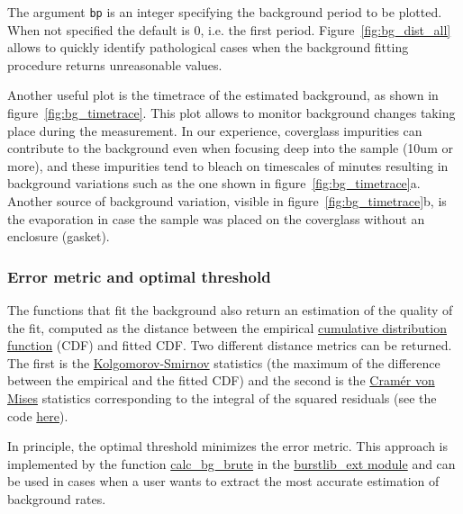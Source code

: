 The argument \verb|bp| is an integer specifying the background period to be plotted.
When not specified the default is 0, i.e. the first period.
Figure~\ref{fig:bg_dist_all} allows to quickly identify pathological cases when the 
background fitting procedure returns unreasonable values. 

Another useful plot is the timetrace of the estimated background, as shown in 
figure~\ref{fig:bg_timetrace}. This plot allows to monitor background changes
taking place during the measurement. In our experience, coverglass impurities
can contribute to the background even when focusing deep into the sample (10um or more),
and these impurities tend to bleach on timescales of minutes resulting in
background variations such as the one shown in figure~\ref{fig:bg_timetrace}a.
Another source of background variation, visible in figure~\ref{fig:bg_timetrace}b, is 
the evaporation in case the sample was placed on the coverglass without an enclosure (gasket).

\subsubsection{Error metric and optimal threshold}

The functions that fit the background also return an estimation of the
quality of the fit, computed as the distance between the empirical
\href{http://en.wikipedia.org/wiki/Cumulative\_distribution\_function}{cumulative distribution function}
(CDF) and fitted CDF. Two different distance metrics can be returned.
The first is the
\href{http://en.wikipedia.org/wiki/Kolmogorov\%E2\%80\%93Smirnov\_test}{Kolgomorov-Smirnov}
statistics (the maximum of the difference between the empirical and the
fitted CDF) and the second is the
\href{http://en.wikipedia.org/wiki/Cram\%C3\%A9r\%E2\%80\%93von\_Mises\_criterion}{Cramér von Mises}
statistics corresponding to the integral of the squared residuals
(see the code
\href{https://github.com/tritemio/FRETBursts/blob/master/fretbursts/background.py#L41}{here}).

In principle, the optimal threshold minimizes
the error metric. This approach is implemented by the function
\href{http://fretbursts.readthedocs.org/en/latest/plugins.html#fretbursts.burstlib\_ext.calc\_bg\_brute}{calc\_bg\_brute}
in the
\href{http://fretbursts.readthedocs.org/en/latest/plugins.html}{burstlib\_ext module} and can be used
in cases when a user wants to extract the most accurate estimation of background rates.
